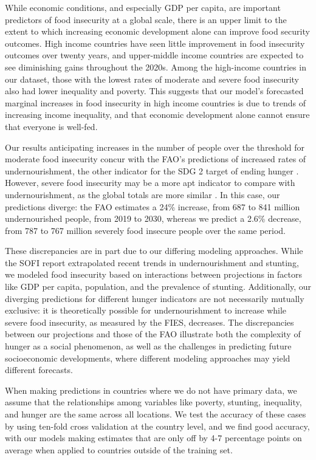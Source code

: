 \documentclass{article}
\begin{document}
While economic conditions, and especially GDP per capita, are important predictors of food insecurity at a global scale, there is an upper limit to the extent to which increasing economic development alone can improve food security outcomes.  High income countries have seen little improvement in food insecurity outcomes over twenty years, and upper-middle income countries are expected to see diminishing gains throughout the 2020s.  Among the high-income countries in our dataset, those with the lowest rates of moderate and severe food insecurity also had lower inequality and poverty.  This suggests that our model's forecasted marginal increases in food insecurity in high income countries is due to trends of increasing income inequality, and that economic development alone cannot ensure that everyone is well-fed.

Our results anticipating increases in the number of people over the threshold for moderate food insecurity concur with the FAO's predictions of increased rates of undernourishment, the other indicator for the SDG 2 target of ending hunger \citep[Part 1, Page 11]{sofi2020}.  However, severe food insecurity may be a more apt indicator to compare with undernourishment, as the global totals are more similar \citep{sofi2020}.  In this case, our predictions diverge: the FAO estimates a 24\% increase, from 687 to 841 million undernourished people, from 2019 to 2030, whereas we predict a 2.6\% decrease, from 787 to 767 million severely food insecure people over the same period.

These discrepancies are in part due to our differing modeling approaches. While the SOFI report extrapolated recent trends in undernourishment and stunting, we modeled food insecurity based on interactions between projections in factors like GDP per capita, population, and the prevalence of stunting. Additionally, our diverging predictions for different hunger indicators are not necessarily mutually exclusive: it is theoretically possible for undernourishment to increase while severe food insecurity, as measured by the FIES, decreases.  The discrepancies between our projections and those of the FAO illustrate both the complexity of hunger as a social phenomenon, as well as the challenges in predicting future socioeconomic developments, where different modeling approaches may yield different forecasts.

When making predictions in countries where we do not have primary data, we assume that the relationships among variables like poverty, stunting, inequality, and hunger are the same across all locations.  We test the accuracy of these cases by using ten-fold cross validation at the country level, and we find good accuracy, with our models making estimates that are only off by 4-7 percentage points on average when applied to countries outside of the training set. 
\end{document}
